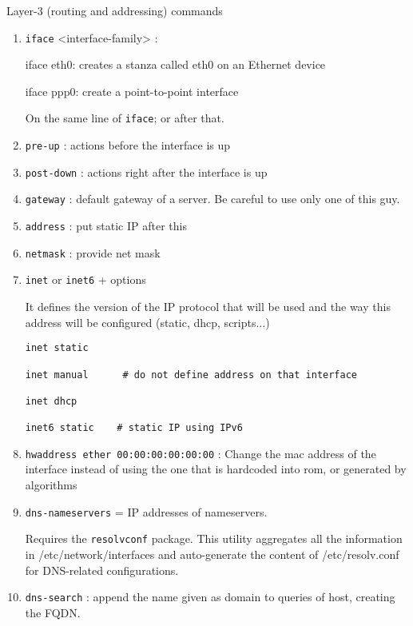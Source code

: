 Layer-3 (routing and addressing) commands
\begin{enumerate}
  \item \verb!iface! <interface-family> : 
  
  iface eth0: creates a stanza called eth0 on an Ethernet device
  
  iface ppp0: create a point-to-point interface
  
  On the same line of \verb!iface!; or after that.
  
  \item \verb!pre-up! : actions before the interface is up
  
  \item \verb!post-down! : actions right after the interface is up
  
  \item \verb!gateway! : default gateway of a server. Be careful to use only one
  of this guy.
  
  \item \verb!address! : put static IP after this
  
  \item \verb!netmask! : provide net mask
  
  \item \verb!inet! or   \verb!inet6! + options
  
  It defines the version of the IP protocol that will be used and the way this
  address will be configured (static, dhcp, scripts...)
\begin{verbatim}
inet static

inet manual      # do not define address on that interface

inet dhcp

inet6 static    # static IP using IPv6
\end{verbatim}  

  \item \verb!hwaddress ether 00:00:00:00:00:00! : Change the mac address of the
  interface instead of using the one that is hardcoded into rom, or generated by algorithms
  
  \item \verb!dns-nameservers! = IP addresses of nameservers.
  
  Requires the \verb!resolvconf! package. This utility 
  aggregates all the information in /etc/network/interfaces
  and auto-generate the content of /etc/resolv.conf for
  DNS-related configurations.
  
  \item \verb!dns-search! : 
  append the name given as domain to queries of host, creating the FQDN. 
  

\end{enumerate}
